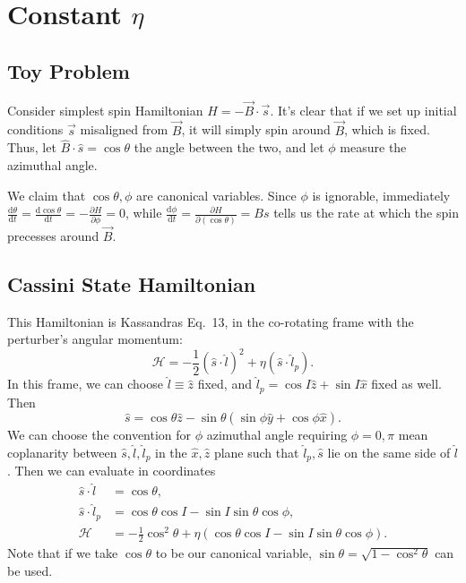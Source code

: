 \documentclass[11pt,
        usenames, %
        dvipsnames %
    ]{article}
\newcommand*{\rd}[2]{\frac{\mathrm{d}#1}{\mathrm{d}#2}}
\newcommand*{\pd}[2]{\frac{\partial#1}{\partial#2}}
\newcommand*{\p}[1]{\left(#1\right)}
\begin{document}
\renewcommand*{\sectionautorefname}{\Snospace}
\renewcommand*{\appendixautorefname}{\Snospace}
\renewcommand*{\figureautorefname}{Fig.}
\renewcommand*{\equationautorefname}{Eq.}
\renewcommand*{\tableautorefname}{Tab.}

\section{Constant $\eta$}

\subsection{Toy Problem}

Consider simplest spin Hamiltonian $H = -\vec{B} \cdot \vec{s}$. It's clear that
if we set up initial conditions $\vec{s}$ misaligned from $\vec{B}$, it will
simply spin around $\vec{B}$, which is fixed. Thus, let $\hat{B} \cdot \hat{s} =
\cos \theta$ the angle between the two, and let $\phi$ measure the azimuthal
angle.

We claim that $\cos \theta, \phi$ are canonical variables. Since $\phi$ is
ignorable, immediately $\rd{\theta}{t} = \rd{\cos \theta}{t} = -\pd{H}{\phi} =
0$, while $\rd{\phi}{t} = \pd{H}{(\cos \theta)} = Bs$ tells us the rate at which
the spin precesses around $\vec{B}$.

\subsection{Cassini State Hamiltonian}

This Hamiltonian is Kassandras Eq.\ 13, in the co-rotating frame with the
perturber's angular momentum:
\begin{equation}
    \mathcal{H} = -\frac{1}{2}\p{\hat{s} \cdot \hat{l}}^2
        + \eta \p{\hat{s} \cdot \hat{l}_p}.
\end{equation}
In this frame, we can choose $\hat{l} \equiv \hat{z}$ fixed, and $\hat{l}_p =
\cos I\hat{z} + \sin I\hat{x}$ fixed as well. Then
\begin{equation*}
    \hat{s} = \cos\theta \hat{z}
        - \sin\theta\p{\sin \phi \hat{y} + \cos \phi \hat{x}}.
\end{equation*}
We can choose the convention for $\phi$ azimuthal angle requiring $\phi =
0, \pi$ mean coplanarity between $\hat{s}, \hat{l}, \hat{l}_p$ in the $\hat{x},
\hat{z}$ plane such that $\hat{l}_p, \hat{s}$ lie on the same side of
$\hat{l}$. Then we can evaluate in coordinates
\begin{align*}
    \hat{s} \cdot \hat{l} &= \cos \theta,\\
    \hat{s} \cdot \hat{l}_p
        &= \cos \theta \cos I - \sin I \sin \theta \cos \phi,\\
    \mathcal{H} &= -\frac{1}{2}\cos^2\theta
        + \eta \p{\cos \theta \cos I - \sin I \sin \theta \cos \phi}.
\end{align*}
Note that if we take $\cos\theta$ to be our canonical variable, $\sin\theta =
\sqrt{1 - \cos^2\theta}$ can be used.
\end{document}
